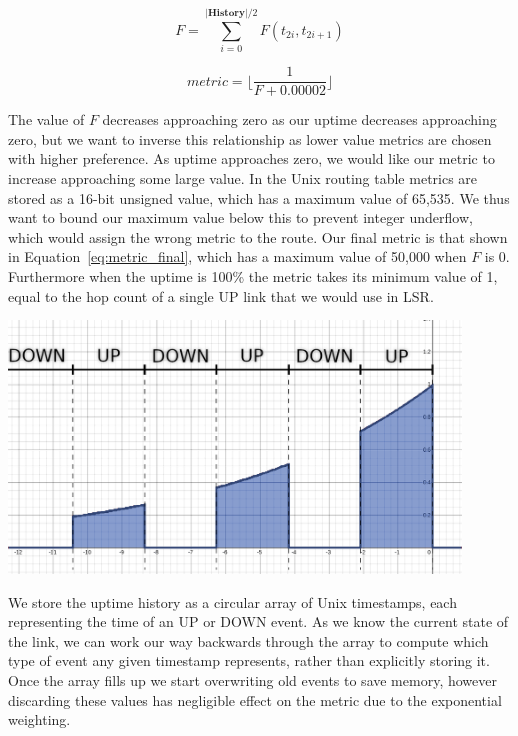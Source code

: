 \documentclass[withindex,glossary,openany]{cam-thesis}
\begin{document}
\begin{equation} \label{eq:metric_sum}
F = \sum_{i = 0}^{|\textbf{History}|/2} F(t_{2i}, t_{2i+1})
\end{equation}

\begin{equation} \label{eq:metric_final}
\textit{metric} = \Big\lfloor\frac{1}{F+0.00002}\Big\rfloor
\end{equation}

The value of $F$ decreases approaching zero as our uptime decreases approaching zero, but we want to inverse this relationship as lower value metrics are chosen with higher preference. As uptime approaches zero, we would like our metric to increase approaching some large value. In the Unix routing table metrics are stored as a 16-bit unsigned value, which has a maximum value of 65,535. We thus want to bound our maximum value below this to prevent integer underflow, which would assign the wrong metric to the route. Our final metric is that shown in Equation~\ref{eq:metric_final}, which has a maximum value of 50,000 when $F$ is 0. Furthermore when the uptime is 100\% the metric takes its minimum value of 1, equal to the hop count of a single UP link that we would use in LSR.

\begin{center}
\begin{minipage}{0.9\textwidth} \centering
	\includegraphics[width=0.9\textwidth]{metric}
	\label{fig:metric}
\end{minipage}
\end{center}

We store the uptime history as a circular array of Unix timestamps, each representing the time of an UP or DOWN event. As we know the current state of the link, we can work our way backwards through the array to compute which type of event any given timestamp represents, rather than explicitly storing it. Once the array fills up we start overwriting old events to save memory, however discarding these values has negligible effect on the metric due to the exponential weighting.
\end{document}
